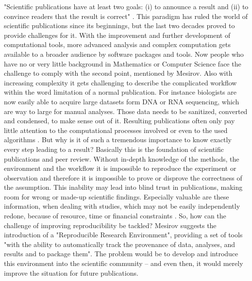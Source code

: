 "Scientific publications have at least two goals: (i) to announce a result and (ii) to convince readers that the result is correct" \citep{Mesirov2010}.
This paradigm has ruled the world of scientific publications since its beginnings, but the last two decades proved to provide challenges for it. With the improvement and further development of computational tools, more advanced analysis and complex computation gets available to a broader audience by software packages and tools. Now people who have no or very little background in Mathematics or Computer Science face the challenge to comply with the second point, mentioned by Mesirov. Also with increasing complexity it gets challenging to describe the complicated workflow within the word limitation of a normal publication.
For instance biologists are now easily able to acquire large datasets form DNA or RNA sequencing, which are way to large for manual analyses. Those data needs to be sanitized, converted and condensed, to make sense out of it. Resulting publications often only pay little attention to the computational processes involved or even to the used algorithms \citep{Peng2011}.
But why is it of such a tremendous importance to know exactly every step leading to a result? Basically this is the foundation of scientific publications and peer review. Without in-depth knowledge of the methods, the environment and the workflow it is impossible to reproduce the experiment or observation and therefore it is impossible to prove or disprove the correctness of the assumption. This inability may lead into blind trust in publications, making room for wrong or made-up scientific findings.
Especially valuable are these information, when dealing with studies, which may not be easily independently redone, because of resource, time or financial constraints \citep{Peng2011}.
So, how can the challenge of improving reproducibility be tackled? Mesirov \citep{Mesirov2010} suggests the introduction of a "Reproducible Research Environment", providing a set of tools "with the ability to automatically track the provenance of data, analyses, and results and to package them".
The problem would be to develop and introduce this environment into the scientific community -- and even then, it would merely improve the situation for future publications.

